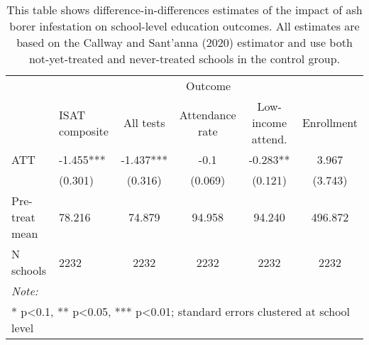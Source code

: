 \begin{table}[!h]

\caption{\label{tab:school-educ-table}This table shows difference-in-differences estimates of the impact of ash borer infestation on school-level education outcomes. All estimates are based on the Callway and Sant'anna (2020) estimator and use both not-yet-treated and never-treated schools in the control group.}
\centering
\begin{tabular}[t]{llcccc}
\toprule
\multicolumn{1}{c}{ } & \multicolumn{5}{c}{Outcome} \\
\cmidrule(l{3pt}r{3pt}){2-6}
  & ISAT composite & All tests & Attendance rate & Low-income attend. & Enrollment\\
\midrule
ATT & -1.455*** & -1.437*** & -0.1 & -0.283** & 3.967\\
 & (0.301) & (0.316) & (0.069) & (0.121) & (3.743)\\
\midrule
Pre-treat mean & 78.216 & 74.879 & 94.958 & 94.240 & 496.872\\
N schools & 2232 & 2232 & 2232 & 2232 & 2232\\
\bottomrule
\multicolumn{6}{l}{\rule{0pt}{1em}\textit{Note: }}\\
\multicolumn{6}{l}{\rule{0pt}{1em}* p<0.1, ** p<0.05, *** p<0.01; standard errors clustered at school level}\\
\end{tabular}
\end{table}
